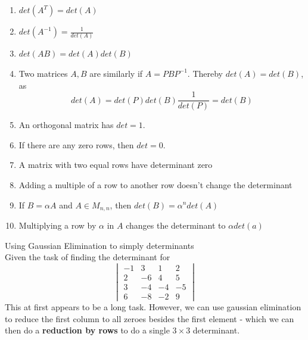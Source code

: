 \documentclass[journal, letterpaper]{IEEEtran}
\begin{document}
    \begin{enumerate}
        \item $det(A^T) = det(A)$
        \item $det(A^{-1}) = \frac{1}{det(A)}$
        \item $det(AB) = det(A)det(B)$
        \item Two matrices $A, B$ are similarly if $A = PBP^{-1}$. Thereby $det(A) = det(B)$, as
        $$ det(A) = det(P)det(B)\frac{1}{det(P)} = det(B)$$
        \item An orthogonal matrix has $det = 1$.
        \item If there are any zero rows, then $det = 0$.
        \item A matrix with two equal rows have determinant zero
        \item Adding a multiple of a row to another row doesn't change the determinant
        \item If $B = \alpha A$ and $A \in M_{n, n}$, then $det(B) = \alpha^n det(A)$
        \item Multiplying a row by $\alpha$ in $A$ changes the determinant to $\alpha det(a)$
    \end{enumerate}
    \begin{myboxr}{Using Gaussian Elimination to simply determinants} \\ 
        Given the task of finding the determinant for
        $$
        \begin{vmatrix}
            -1 & 3 & 1 & 2 \\ 2 & -6 & 4 & 5 \\ 3 & -4 & -4 & -5 \\ 6 & -8 & -2 & 9
        \end{vmatrix}
        $$
        This at first appears to be a long task. However, we can use gaussian elimination to reduce the 
        first column to all zeroes besides the first element - which we can then do a \textbf{reduction by rows} to do a single $3 \times 3$ determinant.
    \end{myboxr}
\end{document}
